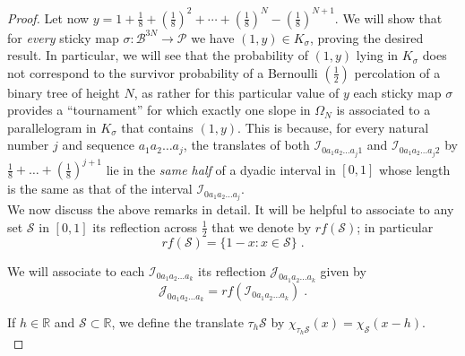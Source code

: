 \documentclass[12pt]{amsart}
\numberwithin{equation}{section}
\theoremstyle{definition}
\theoremstyle{remark}
\begin{document}
\begin{proof}
Let now $y = 1 + \frac{1}{8} + (\frac{1}{8})^2 + \cdots + (\frac{1}{8})^{N} - (\frac{1}{8})^{N+1}$.   We will show that for \emph{every} sticky map $\sigma: \mathscr{B}^{3N} \rightarrow {\mathscr{P}}$ we have $(1,y) \in K_\sigma$, proving the desired result.   In particular, we will see that the probability of $(1,y)$ lying in $K_\sigma$ does not correspond to the survivor probability of  a  Bernoulli $(\frac{1}{2})$ percolation of a binary tree of height $N$, as rather for this particular value of $y$ each sticky map $\sigma$ provides a ``tournament'' for which exactly one slope in $\Omega_N$ is associated to a parallelogram  in $K_{\sigma}$ that contains $(1,y)$.   This is because, for every natural number $j$ and sequence $a_1a_2\ldots a_{j}$, the translates of both  $\mathcal{I}_{0a_1a_2\ldots a_j1}$ and $\mathcal{I}_{0a_1a_2\ldots a_j2}$ by $\frac{1}{8} + \dots + (\frac{1}{8})^{j+1}$ lie in the \emph{same half} of a dyadic interval in $[0,1]$ whose length is the same as that of the interval $\mathcal{I}_{0a_1a_2\ldots a_{j}}$.  
\\

We now discuss the above remarks in detail.   It will be helpful to associate to any set $\mathcal{S}$ in $[0,1]$ its reflection across $\frac{1}{2}$ that we denote by $rf (\mathcal{S})$; in particular 
$$rf (\mathcal{S}) = \{1 - x : x \in \mathcal{S}\}\;.$$  

 We will associate to each $\mathcal{I}_{0a_1a_2\ldots a_k}$ its reflection  $\mathcal{J}_{0a_1a_2\ldots a_k}$ given by
$$\mathcal{J}_{0a_1a_2\ldots a_k} = rf(\mathcal{I}_{0a_1a_2\ldots a_k})\;.$$

If $h \in \mathbb{R}$ and $\mathcal{S} \subset \mathbb{R}$, we define the translate $\tau_h \mathcal{S}$ by $\chi_{\tau_h \mathcal{S}}(x) = \chi_\mathcal{S}(x-h)$.
\\


\end{proof}
\end{document}
